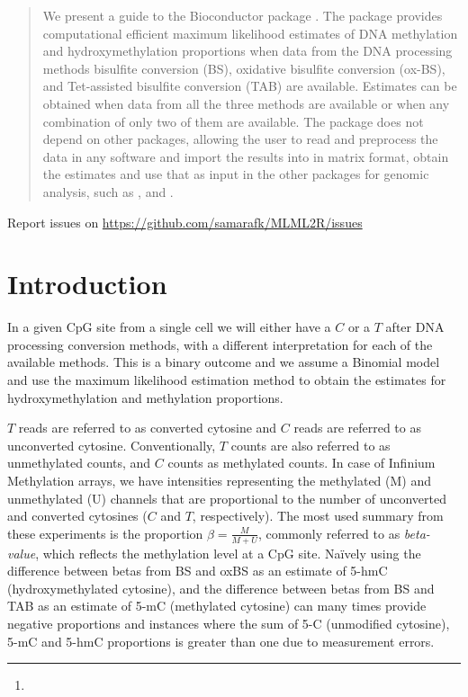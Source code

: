 \documentclass{article}
\author{Samara F. Kiihl\thanks{\email{samara@ime.unicamp.br}}\, and Maria Tellez-Plaza}
\begin{document}
\maketitle

\begin{abstract}

We present a guide to the Bioconductor package . The package provides computational efficient maximum likelihood estimates of DNA methylation and hydroxymethylation proportions when data from the DNA processing methods bisulfite conversion (BS), oxidative bisulfite conversion (ox-BS), and Tet-assisted bisulfite conversion (TAB) are available. Estimates can be obtained when data from all the three methods are available or when any combination of only two of them are available. The package does not depend on other \R{} packages, allowing the user  to read and preprocess the data in any software and import the results into \R{} in matrix format, obtain the estimates and use that as input in the other packages for genomic analysis, such as ,  and .

\end{abstract}

Report issues on \url{https://github.com/samarafk/MLML2R/issues}


\tableofcontents

\newpage

\section{Introduction}

In a given CpG site from a single cell we will either have a $C$ or a $T$ after DNA processing conversion methods, with a different interpretation for each of the available methods. This is a binary outcome and we assume a Binomial model and use the maximum likelihood estimation method to obtain the estimates for hydroxymethylation and methylation proportions.

$T$ reads are referred to as converted cytosine and $C$ reads are referred to as unconverted cytosine. Conventionally, $T$ counts are also referred to as unmethylated counts, and $C$ counts as methylated counts. In case of Infinium Methylation arrays, we have intensities representing the methylated (M) and unmethylated (U) channels that are proportional to the number of unconverted and converted cytosines ($C$ and $T$, respectively). The most used summary from these experiments is  the proportion $\beta=\frac{M}{M+U}$, commonly referred to as \textit{beta-value}, which reflects the methylation level at a CpG site. Na\"ively using the difference between betas from BS and oxBS as an estimate of 5-hmC (hydroxymethylated cytosine), and the difference between betas from BS and TAB as an estimate of 5-mC (methylated cytosine) can many times provide negative proportions and instances where the sum of 5-C (unmodified cytosine), 5-mC and 5-hmC proportions is greater than one due to measurement errors.
\end{document}
